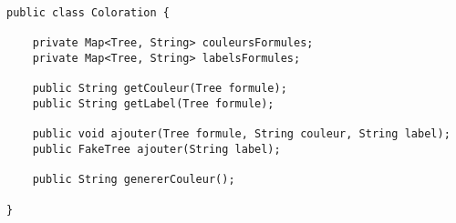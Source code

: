 \documentclass[dvipsnames]{report}
\begin{document}
\begin{lstlisting}[caption={Classe \psverb+Coloration+}, label={lst:Coloration}]
public class Coloration {

	private Map<Tree, String> couleursFormules;
	private Map<Tree, String> labelsFormules;

	public String getCouleur(Tree formule);
	public String getLabel(Tree formule);

	public void ajouter(Tree formule, String couleur, String label);
	public FakeTree ajouter(String label);

	public String genererCouleur();

}
\end{lstlisting}
\end{document}
